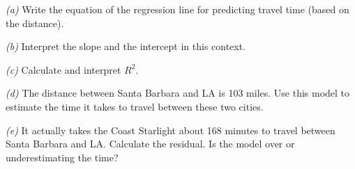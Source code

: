 \documentclass[
]{book}
\begin{document}
\emph{(a)} Write the equation of the regression line for predicting travel time (based on the distance).

\emph{(b)} Interpret the slope and the intercept in this context.

\emph{(c)} Calculate and interpret \(R^2\).

\emph{(d)} The distance between Santa Barbara and LA is 103 miles. Use this model to estimate the time it takes to travel between these two cities.

\emph{(e)} It actually takes the Coast Starlight about 168 minutes to travel between Santa Barbara and LA. Calculate the residual. Is the model over or underestimating the time?

  
\end{document}
